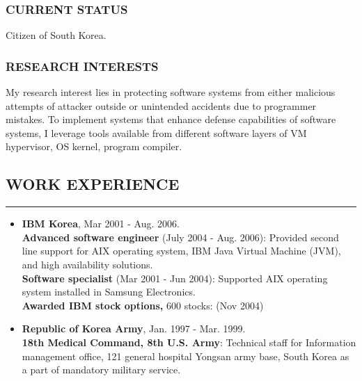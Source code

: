 \documentclass[10pt,a4]{article}
\begin{document}
\begin{small}
\subsubsection*{CURRENT STATUS}
\begin{list}{}{}
\item Citizen of South Korea.
\end{list}

\subsubsection*{RESEARCH INTERESTS}

\begin{list}{}{}
\item My research interest lies in protecting software systems from either
  malicious attempts of attacker outside or unintended accidents due to
  programmer mistakes. To implement systems that enhance defense capabilities of
  software systems, I leverage tools available from different software layers of
  VM hypervisor, OS kernel, program compiler.
\end{list}

\subsection*{WORK EXPERIENCE}
\hrule
\vspace{0.2cm}
\begin{itemize}
\item {\bf IBM Korea},  Mar 2001 - Aug. 2006.  \\
  {\bf Advanced software engineer} (July 2004 - Aug. 2006): Provided second line
  support for AIX operating system, IBM Java Virtual Machine (JVM), and high
  availability solutions. \\
  {\bf Software specialist} (Mar 2001 - Jun 2004): Supported AIX operating system
  installed in Samsung Electronics. \\
  {\bf Awarded IBM stock options,} 600 stocks: (Nov 2004)\\
%
\item {\bf Republic of Korea Army}, Jan. 1997 - Mar. 1999. \\
{\bf 18th Medical Command, 8th U.S. Army}: Technical staff for Information
management office, 121 general hospital Yongsan army base, South Korea as a part
of mandatory military service.\\


\end{itemize}
\end{small}
\end{document}
